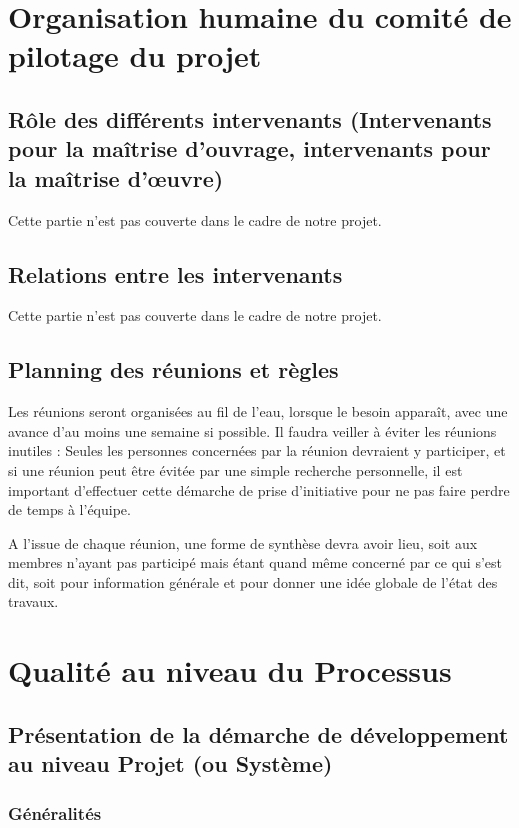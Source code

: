 \documentclass[a4paper]{article}
\begin{document}
\section{Organisation humaine du comité de pilotage du projet}

\subsection{Rôle des différents intervenants (Intervenants pour la maîtrise d'ouvrage, intervenants pour la maîtrise d'œuvre)}
Cette partie n'est pas couverte dans le cadre de notre projet.

\subsection{Relations entre les intervenants}
Cette partie n'est pas couverte dans le cadre de notre projet.

\subsection{Planning des réunions et règles}

Les réunions seront organisées au fil de l'eau, lorsque le besoin apparaît, avec une avance d'au moins une semaine si possible. Il faudra veiller à éviter les réunions inutiles : Seules les personnes concernées par la réunion devraient y participer, et si une réunion peut être évitée par une simple recherche personnelle, il est important d'effectuer cette démarche de prise d'initiative pour ne pas faire perdre de temps à l'équipe.

A l'issue de chaque réunion, une forme de synthèse devra avoir lieu, soit aux membres n'ayant pas participé mais étant quand même concerné par ce qui s'est dit, soit pour information générale et pour donner une idée globale de l'état des travaux.

\section{Qualité au niveau du Processus}

\subsection{Présentation de la démarche de développement au niveau Projet (ou Système)}

\subsubsection{Généralités}
\end{document}
